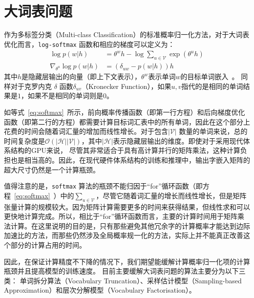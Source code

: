 \section{大词表问题}
作为多标签分类（Multi-class Classification）的标准概率归一化方法，对于大词表优化而言，\texttt{log-softmax} 函数和相应的梯度可以定义为：
\begin{equation}
\label{eq:softmax}
\begin{split}
\log p(w|h) &= \theta^w h-\log \sum_{u\in \mathcal{V}}{\exp(\theta^u h)}\\
\nabla_{\theta^u}{\log p(w|h)}&= (\delta_{uw}-p(w|h))h
\end{split}
\end{equation}
其中$ h $是隐藏层输出的向量（即上下文表示），$ \theta ^ w $表示单词$ w $的目标单词嵌入~。 同样对于克罗内克 $\delta$ 函数$ \delta_ {uv} $（Kronecker Function），如果$ u,v $指代的是相同的单词结果是$ 1 $，如果不是相同的单词则是$ 0 $。


如等式~\ref{eq:softmax}~所示，前向概率传播函数（即第一行方程）和后向梯度优化函数（即第二行的方程）都需要计算目标词汇表中的所有单词，因此在这个部分上花费的时间会随着词汇量的增加而线性增长。对于包含$ \mathcal{| V |} $ 数量的单词来说，总的时间复杂度是$ \mathcal {O}(\mathcal {| H || V |})$，其中$ \mathcal {| H |} $表示隐藏层输出的维度。即使对于采用现代体系结构的GPU来说， 尽管其非常适合于具有高计算并行的矩阵乘法，这种计算负担也是相当高的。因此，在现代硬件体系结构的训练和推理中，输出字嵌入矩阵的超大尺寸仍然是一个计算瓶颈。

值得注意的是，\texttt{softmax} 算法的瓶颈不能归因于``for''循环函数（即方程~\ref{eq:softmax}~）中的$ \sum_ {u \in \mathcal {V}} $，尽管它随着词汇量的增长而线性增长，但是矩阵张量计算的规模较大。因为矩阵计算需要更多的时间来获得结果，但线性求和可以更快地计算完成。所以，相比于``for''循环函数而言，主要的计算时间用于矩阵乘法计算。在这里说明的目的是，只有那些避免其他冗余字的计算概率才能达到边际加速比的方法，而那些仍然涉及全局概率规一化的方法，实际上并不能真正改善这个部分的计算占用的时间。


因此，在保证计算精度不下降的情况下，我们期望能缓解计算概率归一化项的计算瓶颈并且提高模型的训练速度。 目前主要缓解大词表问题的算法主要分为以下三类： 单词拆分算法（Vocabulary Truncation）、采样估计模型（Sampling-based Approximation）和层次分解模型（Vocabulary Factorisation）。


